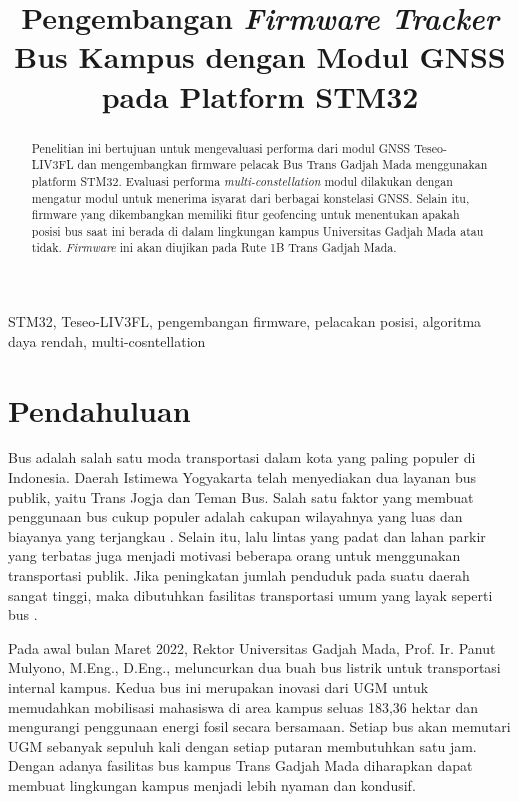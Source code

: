 \documentclass[conference]{IEEEtran}
\begin{document}
\title{Pengembangan \textit{Firmware Tracker} Bus Kampus dengan Modul GNSS pada Platform STM32}

\author{
}

\maketitle

\begin{abstract}
Penelitian ini bertujuan untuk mengevaluasi performa dari modul GNSS Teseo-LIV3FL dan mengembangkan firmware pelacak Bus Trans Gadjah Mada menggunakan platform STM32. Evaluasi performa \textit{multi-constellation} modul dilakukan dengan mengatur modul untuk menerima isyarat dari berbagai konstelasi GNSS. Selain itu, firmware yang dikembangkan memiliki fitur geofencing untuk menentukan apakah posisi bus saat ini berada di dalam lingkungan kampus Universitas Gadjah Mada atau tidak. \textit{Firmware} ini akan diujikan pada Rute 1B Trans Gadjah Mada.
\end{abstract}

\begin{IEEEkeywords}
STM32, Teseo-LIV3FL, pengembangan firmware, pelacakan posisi, algoritma daya rendah, multi-cosntellation
\end{IEEEkeywords}

\section{Pendahuluan}
Bus adalah salah satu moda transportasi dalam kota yang paling populer di Indonesia. Daerah Istimewa Yogyakarta telah menyediakan dua layanan bus publik, yaitu Trans Jogja dan Teman Bus. Salah satu faktor yang membuat penggunaan bus cukup populer adalah cakupan wilayahnya yang luas dan biayanya yang terjangkau \cite{Rohani2013}. Selain itu, lalu lintas yang padat dan lahan parkir yang terbatas juga menjadi motivasi beberapa orang untuk menggunakan transportasi publik. Jika peningkatan jumlah penduduk pada suatu daerah sangat tinggi, maka dibutuhkan fasilitas transportasi umum yang layak seperti bus \cite{Sutandi2015}.

Pada awal bulan Maret 2022, Rektor Universitas Gadjah Mada, Prof. Ir. Panut Mulyono, M.Eng., D.Eng., meluncurkan dua buah bus listrik untuk transportasi internal kampus. Kedua bus ini merupakan inovasi dari UGM untuk memudahkan mobilisasi mahasiswa di area kampus seluas 183,36 hektar dan mengurangi penggunaan energi fosil secara bersamaan. Setiap bus akan memutari UGM sebanyak sepuluh kali dengan setiap putaran membutuhkan satu jam. Dengan adanya fasilitas bus kampus Trans Gadjah Mada diharapkan dapat membuat lingkungan kampus menjadi lebih nyaman dan kondusif.
\end{document}
